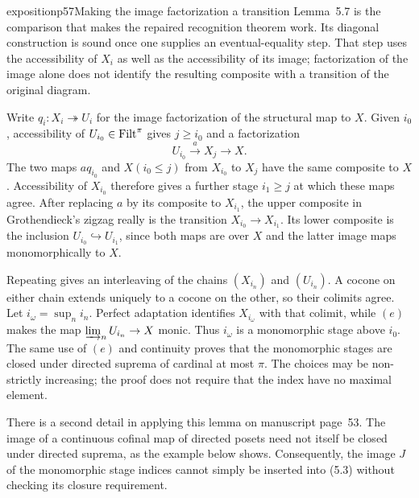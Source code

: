\begin{dcomment}{exposition}{p57}{Making the image factorization a transition}
Lemma~5.7 is the comparison that makes the repaired recognition theorem work. Its diagonal construction is sound once one supplies an eventual-equality step. That step uses the accessibility of $X_i$ as well as the accessibility of its image; factorization of the image alone does not identify the resulting composite with a transition of the original diagram.

Write $q_i:X_i\twoheadrightarrow U_i$ for the image factorization of the structural map to $X$. Given $i_0$, accessibility of $U_{i_0}\in\mathrm{Filt}^\pi$ gives $j\geq i_0$ and a factorization
\[
 U_{i_0}\xrightarrow{a}X_j\longrightarrow X.
\]
The two maps $a q_{i_0}$ and $X(i_0\leq j)$ from $X_{i_0}$ to $X_j$ have the same composite to $X$. Accessibility of $X_{i_0}$ therefore gives a further stage $i_1\geq j$ at which these maps agree. After replacing $a$ by its composite to $X_{i_1}$, the upper composite in Grothendieck's zigzag really is the transition $X_{i_0}\to X_{i_1}$. Its lower composite is the inclusion $U_{i_0}\hookrightarrow U_{i_1}$, since both maps are over $X$ and the latter image maps monomorphically to $X$.

Repeating gives an interleaving of the chains $(X_{i_n})$ and $(U_{i_n})$. A cocone on either chain extends uniquely to a cocone on the other, so their colimits agree. Let $i_\omega=\sup_n i_n$. Perfect adaptation identifies $X_{i_\omega}$ with that colimit, while $(e)$ makes the map $\varinjlim_nU_{i_n}\to X$ monic. Thus $i_\omega$ is a monomorphic stage above $i_0$. The same use of $(e)$ and continuity proves that the monomorphic stages are closed under directed suprema of cardinal at most $\pi$. The choices may be non-strictly increasing; the proof does not require that the index have no maximal element.

There is a second detail in applying this lemma on manuscript page~53. The image of a continuous cofinal map of directed posets need not itself be closed under directed suprema, as the example below shows. Consequently, the image $J$ of the monomorphic stage indices cannot simply be inserted into (5.3) without checking its closure requirement.


\end{dcomment}
